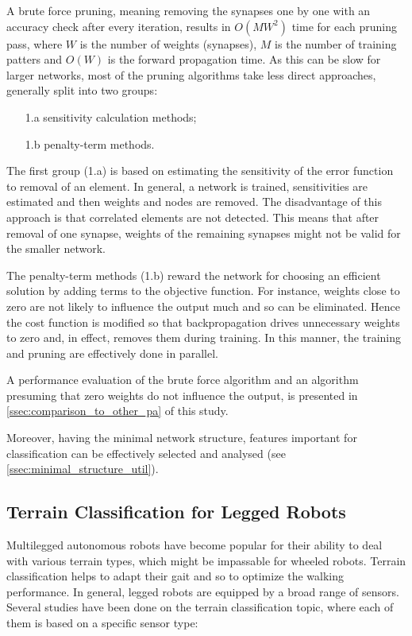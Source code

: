 A brute force pruning, meaning removing the synapses one by one with an accuracy check after every iteration, results in $ O(MW^2) $ time for each pruning pass, where $ W $ is the number of weights (synapses), $ M $ is the number of training patters and $ O(W) $ is the forward propagation time. As this can be slow for larger networks, most of the pruning algorithms take less direct approaches, generally split into two groups:

\begin{enumerate}
\item[1.a] sensitivity calculation methods;
\item[1.b] penalty-term methods.
\end{enumerate}

The first group (1.a) is based on estimating the sensitivity of the error function to removal of an element. In general, a network is trained, sensitivities are estimated and then weights and nodes are removed. The disadvantage of this approach is that correlated elements are not detected. This means that after removal of one synapse, weights of the remaining synapses might not be valid for the smaller network.

The penalty-term methods (1.b) reward the network for choosing an efficient solution by adding terms to the objective function. For instance, weights close to zero are not likely to influence the output much and so can be eliminated. Hence the cost function is modified so that backpropagation drives unnecessary weights to zero and, in effect, removes them during training. In this manner, the training and pruning are effectively done in parallel.

A performance evaluation of the brute force algorithm and an algorithm presuming that zero weights do not influence the output, is presented in \cref{ssec:comparison_to_other_pa} of this study.

Moreover, having the minimal network structure, features important for classification can be effectively selected and analysed (see \cref{ssec:minimal_structure_util}). 

\subsection*{Terrain Classification for Legged Robots} \label{sec:soa_terrain_classification}
Multilegged autonomous robots have become popular for their ability to deal with various terrain types, which might be impassable for wheeled robots. Terrain classification helps to adapt their gait and so to optimize the walking performance. In general, legged robots are equipped by a broad range of sensors. Several studies have been done on the terrain classification topic, where each of them is based on a specific sensor type:

